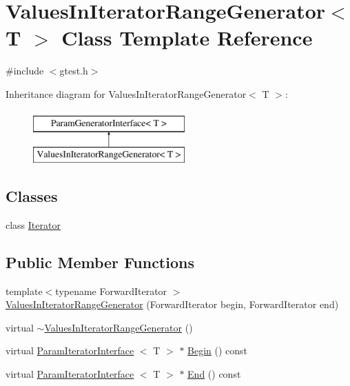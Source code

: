 \hypertarget{classtesting_1_1internal_1_1ValuesInIteratorRangeGenerator}{\section{\-Values\-In\-Iterator\-Range\-Generator$<$ \-T $>$ \-Class \-Template \-Reference}
\label{d7/d34/classtesting_1_1internal_1_1ValuesInIteratorRangeGenerator}
}


{\ttfamily \#include $<$gtest.\-h$>$}

\-Inheritance diagram for \-Values\-In\-Iterator\-Range\-Generator$<$ \-T $>$\-:\begin{figure}[H]
\begin{center}
\leavevmode
\includegraphics[height=2.000000cm]{d7/d34/classtesting_1_1internal_1_1ValuesInIteratorRangeGenerator}
\end{center}
\end{figure}
\subsection*{\-Classes}
\begin{DoxyCompactItemize}
\item 
class \hyperlink{classtesting_1_1internal_1_1ValuesInIteratorRangeGenerator_1_1Iterator}{\-Iterator}
\end{DoxyCompactItemize}
\subsection*{\-Public \-Member \-Functions}
\begin{DoxyCompactItemize}
\item 
{\footnotesize template$<$typename Forward\-Iterator $>$ }\\\hyperlink{classtesting_1_1internal_1_1ValuesInIteratorRangeGenerator_ac2954eee9d4c5a7474ca63aca848c046}{\-Values\-In\-Iterator\-Range\-Generator} (\-Forward\-Iterator begin, \-Forward\-Iterator end)
\item 
virtual \hyperlink{classtesting_1_1internal_1_1ValuesInIteratorRangeGenerator_a7fa35aa4c9c3c6ee4663f2ba954ceeac}{$\sim$\-Values\-In\-Iterator\-Range\-Generator} ()
\item 
virtual \hyperlink{classtesting_1_1internal_1_1ParamIteratorInterface}{\-Param\-Iterator\-Interface}\*
$<$ \-T $>$ $\ast$ \hyperlink{classtesting_1_1internal_1_1ValuesInIteratorRangeGenerator_a9a158e0a461a4980161d14978995ecee}{\-Begin} () const 
\item 
virtual \hyperlink{classtesting_1_1internal_1_1ParamIteratorInterface}{\-Param\-Iterator\-Interface}\*
$<$ \-T $>$ $\ast$ \hyperlink{classtesting_1_1internal_1_1ValuesInIteratorRangeGenerator_a4dd9259ea3453866b5475f17f27d8370}{\-End} () const 
\end{DoxyCompactItemize}
